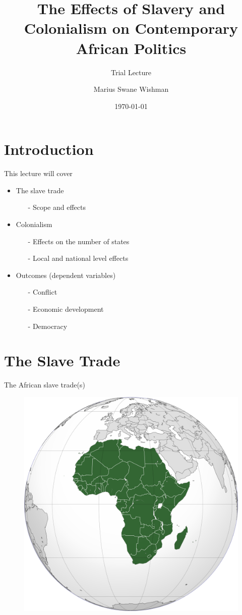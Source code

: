 \documentclass[professionalfont]{beamer}
\title[Trial Lecture]{The Effects of Slavery and Colonialism on Contemporary
African Politics}
\subtitle{Trial Lecture}
\author[Wishman]{Marius Swane Wishman}
\date{\today}
\institute{NTNU}
\begin{document}
\begin{frame}[plain]
\titlepage 
\end{frame}

\section{Introduction} 

\begin{frame}{This lecture will cover}
\begin{itemize}
	\item The slave trade 
\begin{itemize}
	\item[-] Scope and effects 
\end{itemize}
	\item Colonialism 
		\begin{itemize}
			\item[-] Effects on the number of states 
			\item[-] Local and national level effects 
			
		\end{itemize}
	\item Outcomes (dependent variables)
		\begin{itemize}
			\item[-] Conflict
			\item[-] Economic development
			\item[-] Democracy
		\end{itemize}
\end{itemize}	
\end{frame}

\section{The Slave Trade}

\begin{frame}{The African slave trade(s)}

\begin{figure}
	\includegraphics[width=.7\linewidth]{img/africa.png}
\end{figure}

\end{frame}
\end{document}
